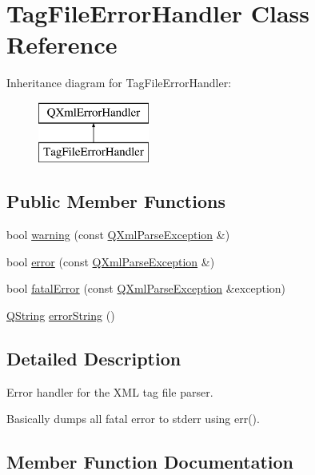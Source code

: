 \hypertarget{class_tag_file_error_handler}{}\section{Tag\+File\+Error\+Handler Class Reference}
\label{class_tag_file_error_handler}
Inheritance diagram for Tag\+File\+Error\+Handler\+:\begin{figure}[H]
\begin{center}
\leavevmode
\includegraphics[height=2.000000cm]{class_tag_file_error_handler}
\end{center}
\end{figure}
\subsection*{Public Member Functions}
\begin{DoxyCompactItemize}
\item 
bool \mbox{\hyperlink{class_tag_file_error_handler_a5512c9023933b9a9a457f75f7654412a}{warning}} (const \mbox{\hyperlink{class_q_xml_parse_exception}{Q\+Xml\+Parse\+Exception}} \&)
\item 
bool \mbox{\hyperlink{class_tag_file_error_handler_ad72696a123207844853784754f3b9a4a}{error}} (const \mbox{\hyperlink{class_q_xml_parse_exception}{Q\+Xml\+Parse\+Exception}} \&)
\item 
bool \mbox{\hyperlink{class_tag_file_error_handler_a7562a9fb258c3d4005ea4a3327623e60}{fatal\+Error}} (const \mbox{\hyperlink{class_q_xml_parse_exception}{Q\+Xml\+Parse\+Exception}} \&exception)
\item 
\mbox{\hyperlink{class_q_string}{Q\+String}} \mbox{\hyperlink{class_tag_file_error_handler_a699ed3bca495674a04d051a6a7a0b96d}{error\+String}} ()
\end{DoxyCompactItemize}


\subsection{Detailed Description}
Error handler for the X\+ML tag file parser.

Basically dumps all fatal error to stderr using err(). 

\subsection{Member Function Documentation}
\mbox{\label{class_tag_file_error_handler_ad72696a123207844853784754f3b9a4a}} 
